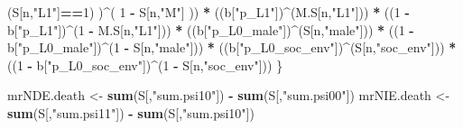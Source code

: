 \documentclass[
]{book}
\newenvironment{Shaded}{\begin{snugshade}}{\end{snugshade}}
\newcommand{\DecValTok}[1]{\textcolor[rgb]{0.00,0.00,0.81}{#1}}
\newcommand{\FunctionTok}[1]{\textcolor[rgb]{0.13,0.29,0.53}{\textbf{#1}}}
\newcommand{\NormalTok}[1]{#1}
\newcommand{\OtherTok}[1]{\textcolor[rgb]{0.56,0.35,0.01}{#1}}
\newcommand{\SpecialCharTok}[1]{\textcolor[rgb]{0.81,0.36,0.00}{\textbf{#1}}}
\newcommand{\StringTok}[1]{\textcolor[rgb]{0.31,0.60,0.02}{#1}}
\begin{document}
\begin{Shaded}
\begin{Highlighting}[]
\NormalTok{          (S[n,}\StringTok{"L1"}\NormalTok{]}\SpecialCharTok{==}\DecValTok{1}\NormalTok{) )}\SpecialCharTok{\^{}}\NormalTok{( }\DecValTok{1} \SpecialCharTok{{-}}\NormalTok{ S[n,}\StringTok{"M"}\NormalTok{] )) }\SpecialCharTok{*}
\NormalTok{      ((b[}\StringTok{"p\_L1"}\NormalTok{])}\SpecialCharTok{\^{}}\NormalTok{(M.S[n,}\StringTok{"L1"}\NormalTok{])) }\SpecialCharTok{*}
\NormalTok{      ((}\DecValTok{1} \SpecialCharTok{{-}}\NormalTok{ b[}\StringTok{"p\_L1"}\NormalTok{])}\SpecialCharTok{\^{}}\NormalTok{(}\DecValTok{1} \SpecialCharTok{{-}}\NormalTok{ M.S[n,}\StringTok{"L1"}\NormalTok{])) }\SpecialCharTok{*}
\NormalTok{      ((b[}\StringTok{"p\_L0\_male"}\NormalTok{])}\SpecialCharTok{\^{}}\NormalTok{(S[n,}\StringTok{"male"}\NormalTok{])) }\SpecialCharTok{*} 
\NormalTok{      ((}\DecValTok{1} \SpecialCharTok{{-}}\NormalTok{ b[}\StringTok{"p\_L0\_male"}\NormalTok{])}\SpecialCharTok{\^{}}\NormalTok{(}\DecValTok{1} \SpecialCharTok{{-}}\NormalTok{ S[n,}\StringTok{"male"}\NormalTok{])) }\SpecialCharTok{*} 
\NormalTok{      ((b[}\StringTok{"p\_L0\_soc\_env"}\NormalTok{])}\SpecialCharTok{\^{}}\NormalTok{(S[n,}\StringTok{"soc\_env"}\NormalTok{])) }\SpecialCharTok{*}
\NormalTok{      ((}\DecValTok{1} \SpecialCharTok{{-}}\NormalTok{ b[}\StringTok{"p\_L0\_soc\_env"}\NormalTok{])}\SpecialCharTok{\^{}}\NormalTok{(}\DecValTok{1} \SpecialCharTok{{-}}\NormalTok{ S[n,}\StringTok{"soc\_env"}\NormalTok{])) }
\NormalTok{    \}}
  
\NormalTok{  mrNDE.death }\OtherTok{\textless{}{-}} \FunctionTok{sum}\NormalTok{(S[,}\StringTok{"sum.psi10"}\NormalTok{]) }\SpecialCharTok{{-}} \FunctionTok{sum}\NormalTok{(S[,}\StringTok{"sum.psi00"}\NormalTok{])}
\NormalTok{  mrNIE.death }\OtherTok{\textless{}{-}} \FunctionTok{sum}\NormalTok{(S[,}\StringTok{"sum.psi11"}\NormalTok{]) }\SpecialCharTok{{-}} \FunctionTok{sum}\NormalTok{(S[,}\StringTok{"sum.psi10"}\NormalTok{])}
  

\end{Highlighting}
\end{Shaded}
\end{document}

